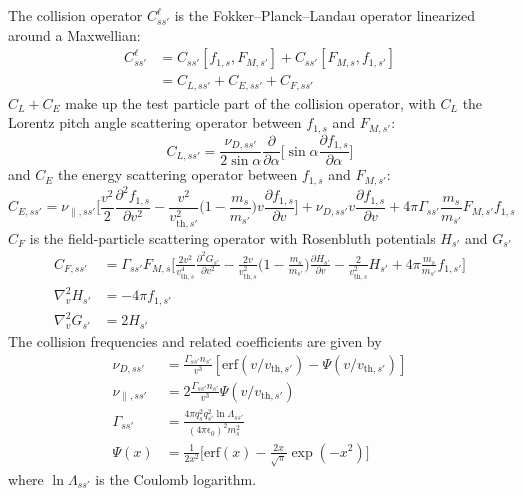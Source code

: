 \documentclass[11pt]{article}
\begin{document}
The collision operator $C^\ell_{ss'}$ is the Fokker--Planck--Landau operator
linearized around a Maxwellian:
\begin{align}
C^\ell_{ss'} &= C_{ss'}[f_{1,s}, F_{M,s'}] + C_{ss'}[F_{M,s}, f_{1,s'}] \\
&= C_{L,ss'} + C_{E,ss'} + C_{F,ss'}
\end{align}
$C_L + C_E$ make up the test particle part of the collision operator, with
$C_L$ the Lorentz pitch angle scattering operator between $f_{1,s}$ and
$F_{M,s'}$:
\begin{equation}
C_{L,ss'} = \frac{\nu_{D,ss'}}{2 \sin \alpha} \frac{\partial}{\partial \alpha}
\Bigg[\sin{\alpha} \frac{\partial f_{1,s}}{\partial \alpha}\Bigg]
\end{equation}
and $C_E$ the energy scattering operator between $f_{1,s}$ and $F_{M,s'}$:
\begin{equation}
C_{E,ss'} = \nu_{\parallel,ss'}\Big[ \frac{v^2}{2} \frac{\partial^2 f_{1,s}}{\partial
v^2}
- \frac{v^2}{v_{\mathrm{th},s'}^2} \Big(1 - \frac{m_s}{m_{s'}} \Big) v
\frac{\partial f_{1,s}}{\partial v}\Big]
+ \nu_{D,ss'} v \frac{\partial f_{1,s}}{\partial v}
+ 4\pi \Gamma_{ss'}\frac{m_s}{m_{s'}} F_{M,s'} f_{1,s}
\end{equation}
$C_F$ is the field-particle scattering operator with Rosenbluth potentials
$H_{s'}$ and $G_{s'}$
\begin{align}
C_{F,ss'} &= \Gamma_{ss'} F_{M,s} \Big[\frac{2v^2}{v_{\mathrm{th},s}^4}
\frac{\partial^2 G_{s'}}{\partial v^2}
- \frac{2v}{v_{\mathrm{th},s}^2} \Big(1 - \frac{m_s}{m_{s'}} \Big)
\frac{\partial H_{s'}}{\partial v}
- \frac{2}{v_{\mathrm{th},s}^2} H_{s'} + 4\pi \frac{m_s}{m_{s'}} f_{1,s'} \Big] \\
\nabla^2_v H_{s'} &= -4 \pi f_{1,s'} \\
\nabla^2_v G_{s'} &= 2 H_{s'}
\end{align}
The collision frequencies and related coefficients are given by
\begin{align}
\nu_{D,ss'} &= \frac{\Gamma_{ss'} n_{s'}}{v^3}
[\mathrm{erf}(v/v_{\mathrm{th},s'}) - \Psi(v/v_{\mathrm{th},s'})] \\
\nu_{\parallel,ss'} &= 2 \frac{\Gamma_{ss'} n_{s'}}{v^3} \Psi(v/v_{\mathrm{th},s'}) \\
\Gamma_{ss'} &= \frac{4\pi q_s^2 q_{s'}^2 \ln \Lambda_{ss'}}
{(4\pi \epsilon_0)^2 m_s^2} \\
\Psi(x) &= \frac{1}{2x^2}\Big[\mathrm{erf}(x)
- \frac{2x}{\sqrt{\pi}} \exp(-x^2) \Big]
\end{align}
where $\ln \Lambda_{ss'}$ is the Coulomb logarithm.
\end{document}
